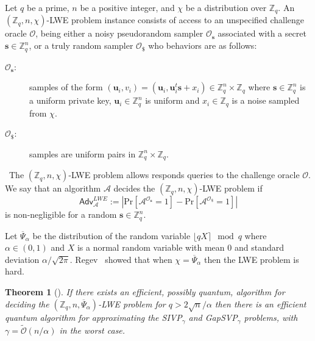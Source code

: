 \documentclass[a4paper,11pt,onecolumn]{elsarticle}
\def\ZZ{\mathbb{Z}}
\def\cal{\mathcal}
\def\bf{\mathbf}
\def\Pr{\mathrm{Pr}}
\def\Adv{\mathsf{Adv}}
\def\u{\bf{u}}
\def\s{\bf{s}}
\newtheorem{theorem}{Theorem}
\begin{document}
	\begin{definition}[LWE] \label{dlwe}
	Let $q$ be a prime, $n$ be a positive integer, and $\chi$ be a distribution  over $\ZZ_q$. An $(\ZZ_q,n,\chi)$-LWE problem instance consists of access to an unspecified challenge oracle $\cal{O}$, being either a noisy pseudorandom sampler $\cal{O}_\s$ associated with a secret $\s\in\ZZ_q^n$, or a truly random sampler $\cal{O}_\$$ who behaviors are as follows:
		\begin{description}
			\item[$\cal{O}_\s$:] samples of the form $(\u_i,v_i)=(\u_i,\u_i^t\s+x_i)\in\ZZ_q^n\times\ZZ_q$ where $\s\in\ZZ_q^n$ is a uniform private key, $\u_i\in\ZZ_q^n$ is uniform and $x_i\in\ZZ_q$ is a noise sampled from $\chi$.
			\item[$\cal{O}_\$$:] samples are uniform pairs in $\ZZ_q^n\times\ZZ_q$.
		\end{description}\
		The $(\ZZ_q,n,\chi)$-LWE problem allows responds queries to the challenge oracle $\cal{O}$. We say that an algorithm $\cal{A}$ decides the $(\ZZ_q,n,\chi)$-LWE problem if 
		$$\Adv_{\cal{A}}^{\textit{LWE}}:=\left|\Pr[\cal{A}^{\cal{O}_\s}=1] - \Pr[\cal{A}^{\cal{O}_\$}=1] \right|$$    
		is non-negligible for a random $\s\in\ZZ_q^n$.
	\end{definition}
	
	Let $\overline{\Psi}_\alpha$ be the distribution of the random variable $\lfloor qX\rceil\mod q$ where $\alpha\in(0,1)$ and $X$ is a normal random variable with mean $0$ and standard deviation $\alpha/\sqrt{2\pi}$.  Regev~\cite{Reg09} showed that when $\chi =\overline{\Psi}_\alpha$ then the LWE problem is hard. 
	
	\fi
	
	
	
	\iffalse
	\begin{theorem}[\cite{Reg09}]\label{thm:LWE}%
		If there exists an efficient, possibly quantum, algorithm for deciding the $(\ZZ_q,n,\overline{\Psi}_\alpha)$-LWE problem for $q>2\sqrt{n}/\alpha$ then there is an efficient quantum algorithm for approximating the SIVP$_\gamma$ and GapSVP$_\gamma$ problems, with $\gamma=\widetilde{\cal{O}}(n/\alpha)$ in the worst case.
	\end{theorem}
	
\end{document}
